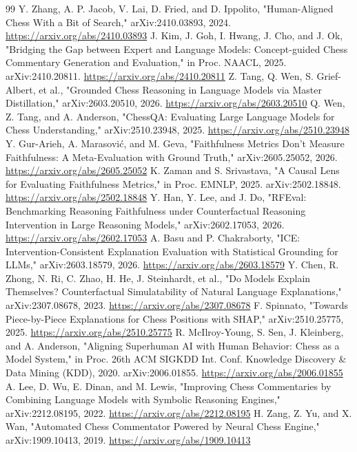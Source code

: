 \documentclass[conference]{IEEEtran}
\begin{document}
\begin{thebibliography}{99}
 Y. Zhang, A. P. Jacob, V. Lai, D. Fried, and D. Ippolito, "Human-Aligned Chess With a Bit of Search," arXiv:2410.03893, 2024. \url{https://arxiv.org/abs/2410.03893}
 J. Kim, J. Goh, I. Hwang, J. Cho, and J. Ok, "Bridging the Gap between Expert and Language Models: Concept-guided Chess Commentary Generation and Evaluation," in Proc. NAACL, 2025. arXiv:2410.20811. \url{https://arxiv.org/abs/2410.20811}
 Z. Tang, Q. Wen, S. Grief-Albert, et al., "Grounded Chess Reasoning in Language Models via Master Distillation," arXiv:2603.20510, 2026. \url{https://arxiv.org/abs/2603.20510}
 Q. Wen, Z. Tang, and A. Anderson, "ChessQA: Evaluating Large Language Models for Chess Understanding," arXiv:2510.23948, 2025. \url{https://arxiv.org/abs/2510.23948}
 Y. Gur-Arieh, A. Marasović, and M. Geva, "Faithfulness Metrics Don't Measure Faithfulness: A Meta-Evaluation with Ground Truth," arXiv:2605.25052, 2026. \url{https://arxiv.org/abs/2605.25052}
 K. Zaman and S. Srivastava, "A Causal Lens for Evaluating Faithfulness Metrics," in Proc. EMNLP, 2025. arXiv:2502.18848. \url{https://arxiv.org/abs/2502.18848}
 Y. Han, Y. Lee, and J. Do, "RFEval: Benchmarking Reasoning Faithfulness under Counterfactual Reasoning Intervention in Large Reasoning Models," arXiv:2602.17053, 2026. \url{https://arxiv.org/abs/2602.17053}
 A. Basu and P. Chakraborty, "ICE: Intervention-Consistent Explanation Evaluation with Statistical Grounding for LLMs," arXiv:2603.18579, 2026. \url{https://arxiv.org/abs/2603.18579}
 Y. Chen, R. Zhong, N. Ri, C. Zhao, H. He, J. Steinhardt, et al., "Do Models Explain Themselves? Counterfactual Simulatability of Natural Language Explanations," arXiv:2307.08678, 2023. \url{https://arxiv.org/abs/2307.08678}
 F. Spinnato, "Towards Piece-by-Piece Explanations for Chess Positions with SHAP," arXiv:2510.25775, 2025. \url{https://arxiv.org/abs/2510.25775}
 R. McIlroy-Young, S. Sen, J. Kleinberg, and A. Anderson, "Aligning Superhuman AI with Human Behavior: Chess as a Model System," in Proc. 26th ACM SIGKDD Int. Conf. Knowledge Discovery \& Data Mining (KDD), 2020. arXiv:2006.01855. \url{https://arxiv.org/abs/2006.01855}
 A. Lee, D. Wu, E. Dinan, and M. Lewis, "Improving Chess Commentaries by Combining Language Models with Symbolic Reasoning Engines," arXiv:2212.08195, 2022. \url{https://arxiv.org/abs/2212.08195}
 H. Zang, Z. Yu, and X. Wan, "Automated Chess Commentator Powered by Neural Chess Engine," arXiv:1909.10413, 2019. \url{https://arxiv.org/abs/1909.10413}

\end{thebibliography}
\end{document}

